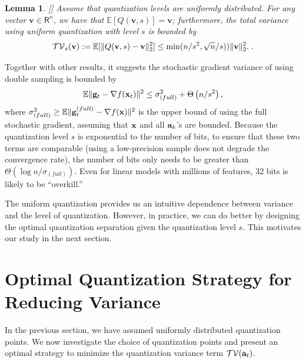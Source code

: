 \documentclass{article}
\newcommand{\R}{\mathsf{R}}
\renewcommand{\vec}[1]{\mathbf{#1}}
\def\a{{\bf a}}
\def\g{{\bf g}}
\def\x{{\bf x}}
\def\v{{\bf v}}
\def\E{\mathbb{E}}
\newtheorem{lemma}{Lemma}
\begin{document}
\begin{lemma}
\label{lem:quant-facts} [\cite{Alistarh:2016:ArXiv}]
Assume that quantization levels are uniformly distributed. For any vector $\vec{v} \in \R^n$, we have that $\E [Q (\vec{v},s)] = \vec{v}$; furthermore, the total variance using uniform quantization with level $s$ is bounded by
\[
\mathcal{TV}_s(\v):=\E [\| Q (\vec{v},s) - \v\|_2^2] \leq \min( n/s^2,\sqrt{n}/s)) \| \vec{v} \|_2^2. \; .
\]
\end{lemma} 

\vspace{-1em}
Together with other results, it suggests the stochastic gradient variance of using double sampling is bounded by
\[
\E\|\g_t - \nabla f(\x_t)\|^2 \leq \sigma^2_{(full)} + \Theta \left( {n /s^2} \right),
\]
where $\sigma^2_{(full)} \geq \E \|\g_t^{(full)} - \nabla f(\x)\|^2$ is the upper bound of using the full stochastic gradient, assuming that $\x$ and all $\a_k$'s are bounded. Because the quantization level $s$ is exponential to the number of bits, to ensure that these two terms are comparable (using a low-precision sample does not degrade the convergence rate), the number of bits only needs to be greater than $\Theta (\log n /\sigma_{(full)})$. Even for linear models with millions
of features, 32 bits is likely to be  ``overkill.''

\vspace{-0.5em}
The uniform quantization provides us an intuitive dependence between variance and the level of quantization. However, in practice, we can do better by designing the optimal quantization separation given the quantization level $s$. This motivates
our study in the next section.





\vspace{-1em}
\section{Optimal Quantization Strategy for Reducing Variance} \label{sec:optimal}

\vspace{-0.5em}

In the previous section, we have assumed uniformly distributed quantization points.  
We now investigate the choice of quantization points and present an optimal strategy to minimize the quantization variance term $\mathcal{TV}(\a_t)$.

\vspace{-1em}
\end{document}
